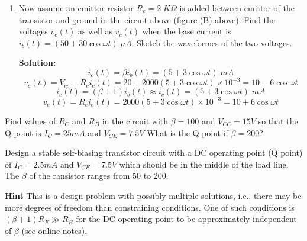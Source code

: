 \begin{enumerate}
\item Now assume an emittor resistor $R_e=2\;K\Omega$ is added between 
emittor of the transistor and ground in the circuit above (figure (B)
above).  Find the voltages $v_e(t)$ as well as $v_c(t)$ when the base
current is $i_b(t)=(50+30 \cos \omega t)\;\mu A$. Sketch the waveformes
of the two voltages.

 {\bf Solution:}
 \[ i_c(t)=\beta i_b(t)=(5+3\cos \omega t)\;mA \]
 \[ v_c(t)=V_{cc}-R_c i_c(t)=20-2000 (5+3\cos \omega t)\times 10^{-3}
    =10-6\cos \omega t  \]
 \[ i_e(t)=(\beta+1) i_b(t)\approx i_c(t)=(5+3\cos \omega t)\;mA \]
 \[ v_e(t)=R_e i_e(t)=2000 (5+3\cos \omega t)\times 10^{-3}
    =10+6\cos \omega t  \]

\end{enumerate}





\item Find values of $R_C$ and $R_B$ in the circuit with $\beta=100$
and $V_{CC}=15V$ so that the Q-point is $I_C=25mA$ and $V_{CE}=7.5V$
What is the Q point if $\beta=200$?




% 

\item Design a stable self-biasing transistor circuit with a DC operating
point (Q point) of $I_C=2.5mA$ and $V_{CE}=7.5V$ which should be in the 
middle of the load line. The $\beta$ of the ransistor ranges from 50 to
200. 

{\bf Hint} This is a design problem with possibly multiple solutions, 
i.e., there may be more degrees of freedom than constraining conditions. 
One of such conditions is $(\beta+1)R_E \gg R_B$ for the DC operating 
point to be approximately independent of $\beta$ (see online notes). 


